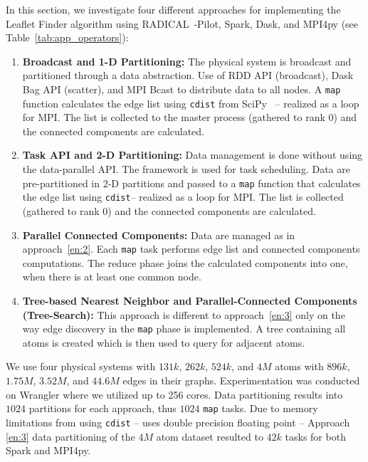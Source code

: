In this section, we investigate four different approaches for implementing the Leaflet Finder algorithm using RADICAL~-Pilot, Spark, Dask, and MPI4py (see Table~\ref{tab:app_operators}):
\begin{enumerate}[1)]
    \item \textbf{Broadcast and 1-D Partitioning:}
    The physical system is broadcast and partitioned through a data abstraction.
    Use of RDD API (broadcast), Dask Bag API (scatter), and MPI Bcast to distribute data to all nodes.
    A \texttt{map} function calculates the edge list using \texttt{cdist} from SciPy~\cite{scipy} -- realized as a loop for MPI.
    The list is collected to the master process (gathered to rank 0) and the connected components are calculated.\label{en:1}
    \item \textbf{Task API and 2-D Partitioning:}
    Data management is done without using the data-parallel API.
    The framework is used for task scheduling.
    Data are pre-partitioned in 2-D partitions and passed to a \texttt{map} function that calculates the edge list using \texttt{cdist}-- realized as a loop for MPI.
    The list is collected (gathered to rank 0) and the connected components are calculated.\label{en:2}
    \item \textbf{Parallel Connected Components:}
    Data are managed as in approach~\ref{en:2}.
    Each \texttt{map} task performs edge list and connected components computations.
    The reduce phase joins the calculated components into one, when there is at least one common node.\label{en:3}
    \item \textbf{Tree-based Nearest Neighbor and Parallel-Connected Components (Tree-Search):}
    This approach is different to approach~\ref{en:3} only on the way edge discovery in the \texttt{map} phase is implemented.
    A tree containing all atoms is created which is then used to query for adjacent atoms.\label{en:4}
\end{enumerate}

We use four physical systems with $131k$, $262k$, $524k$, and $4M$ atoms with $896k$, $1.75M$, $3.52M$, and $44.6M$ edges in their graphs.
Experimentation was conducted on Wrangler where we utilized up to 256 cores.
Data partitioning results into $1024$ partitions for each approach, thus $1024$ \texttt{map} tasks.
Due to memory limitations from using \texttt{cdist} -- uses double precision floating point -- Approach \ref{en:3} data partitioning of the $4M$ atom dataset resulted to $42k$ tasks for both Spark and MPI4py.

